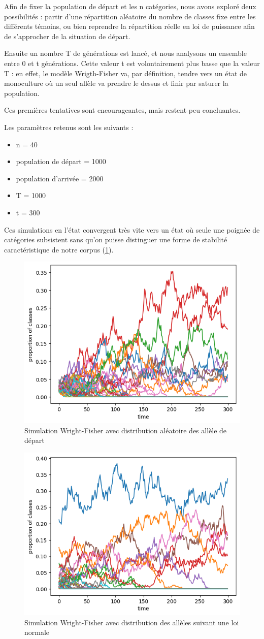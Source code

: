 \documentclass[12pt,a4paper,oneside,titlepage]{book} %
\begin{document}

Afin de fixer la population de départ et les n catégories, nous avons exploré deux possibilités : partir d'une répartition aléatoire du nombre de classes fixe entre les différents témoins, ou bien reprendre la répartition réelle en loi de puissance afin de s'approcher de la situation de départ.

Ensuite un nombre T de générations est lancé, et nous analysons un ensemble entre 0 et t générations. 
Cette valeur t est volontairement plus basse que la valeur T : en effet, le modèle Wrigth-Fisher va, par définition, tendre vers un état de monoculture où un seul allèle va prendre le dessus et finir par saturer la population.

Ces premières tentatives sont encourageantes, mais restent peu concluantes. 

Les paramètres retenus sont les suivants : 
\begin{itemize}
    \item n = 40
    \item population de départ  = 1000
    \item population d'arrivée = 2000
    \item T = 1000
    \item t = 300
\end{itemize}

Ces simulations en l'état convergent très vite vers un état où seule une poignée de catégories subsistent sans qu'on puisse distinguer une forme de stabilité caractéristique de notre corpus (\ref{fig:wf_vanilla}).

\begin{figure}
    \centering
    \includegraphics[width=0.5\linewidth]{illustration/wf_vanilla.png}
    \caption{Simulation Wright-Fisher avec distribution aléatoire des allèle de départ}
    \label{fig:wf_vanilla}
\end{figure}
\begin{figure}
    \centering
    \includegraphics[width=0.5\linewidth]{illustration/wf_pow.png}
    \caption{Simulation Wright-Fisher avec distribution des allèles suivant une loi normale}
    \label{fig:wf_power}
\end{figure}
\end{document}
